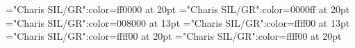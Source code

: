 \documentclass[a4paper]{article}
\begin{document}
\pagestyle{plain}
\sloppy
\setlength{\parfillskip}{0pt plus 1fil}
\font\ta="Charis SIL/GR":color=ff0000 at 20pt
\font\tbta="Charis SIL/GR":color=0000ff at 20pt
\font\tctbta="Charis SIL/GR":color=008000 at 13pt
\font\tdtctbta="Charis SIL/GR":color=ffff00 at 13pt
\font\tdtbta="Charis SIL/GR":color=ffff00 at 20pt
\font\tdta="Charis SIL/GR":color=ffff00 at 20pt

\mbox{} 
\newpage 
\newpage 
\setcounter{page}{1} 
\pagestyle{fancy} 








\end{document}
